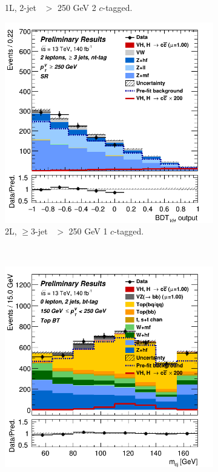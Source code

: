 \begin{figure}[h!]
\begin{subfigure}[b]{0.32\textwidth}
        \caption{1L, 2-jet \ptv\ $>$ 250 GeV 2 $c$-tagged.}
        \label{fig:posfit_1L_SR}
    \end{subfigure}
    \begin{subfigure}[b]{0.32\textwidth}
      \centering
      \includegraphics[width=\textwidth]{Images/VH/Own_fit/postfit_VHcc/Region_distmva_BMin250_DSR_J3_TTypent_incJet1_T1_L2_Y6051_GlobalFit_conditionnal_mu1.png}
      \caption{2L, $\geq$3-jet \ptv\ $>$ 250 GeV 1 $c$-tagged.}
      \label{fig:posfit_2L_SR}
    \end{subfigure} \\
    \begin{subfigure}[b]{0.32\textwidth}
        \centering
        \includegraphics[width=\textwidth]{Images/VH/Own_fit/postfit_VHcc/Region_distmBB_BMax250_BMin150_DtopCRBC_J2_TTypebt_T1_L0_Y6051_GlobalFit_conditionnal_mu1.png}

\end{subfigure}
\end{figure}
